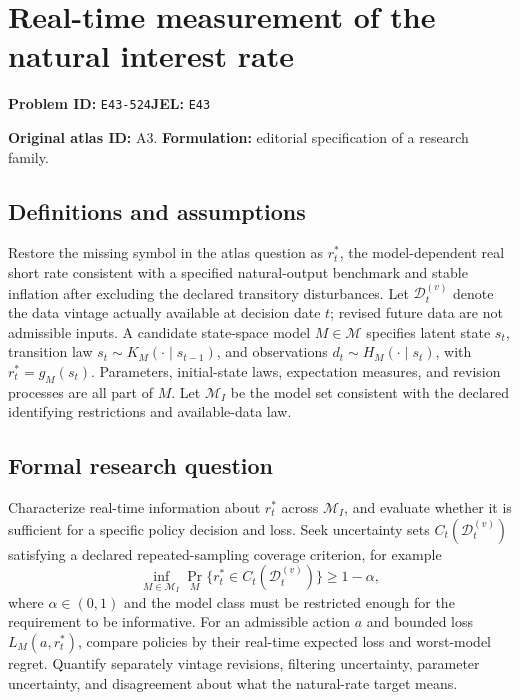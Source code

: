 \documentclass[11pt,a4paper]{article}
\begin{document}
\section*{Real-time measurement of the natural interest rate}
\textbf{Problem ID:} \texttt{E43-524}\quad \textbf{JEL:} \texttt{E43}\par
\label{problem:OP-0013}
\label{atlas:prob:A3}

\noindent\textbf{Original atlas ID:} A3. \textbf{Formulation:} editorial specification of a research family.

\subsection*{Definitions and assumptions}

Restore the missing symbol in the atlas question as $r_t^*$, the model-dependent real short rate consistent with a specified natural-output benchmark and stable inflation after excluding the declared transitory disturbances. Let $\mathcal D_t^{(v)}$ denote the data vintage actually available at decision date $t$; revised future data are not admissible inputs. A candidate state-space model $M\in\mathcal M$ specifies latent state $s_t$, transition law $s_t\sim K_M(\cdot\mid s_{t-1})$, and observations $d_t\sim H_M(\cdot\mid s_t)$, with $r_t^*=g_M(s_t)$. Parameters, initial-state laws, expectation measures, and revision processes are all part of $M$. Let $\mathcal M_I$ be the model set consistent with the declared identifying restrictions and available-data law.

\subsection*{Formal research question}

Characterize real-time information about $r_t^*$ across $\mathcal M_I$, and evaluate whether it is sufficient for a specific policy decision and loss. Seek uncertainty sets $C_t(\mathcal D_t^{(v)})$ satisfying a declared repeated-sampling coverage criterion, for example
\[
\inf_{M\in\mathcal M_I}\Pr_M\{r_t^*\in C_t(\mathcal D_t^{(v)})\}\ge1-\alpha,
\]
where $\alpha\in(0,1)$ and the model class must be restricted enough for the requirement to be informative. For an admissible action $a$ and bounded loss $L_M(a,r_t^*)$, compare policies by their real-time expected loss and worst-model regret. Quantify separately vintage revisions, filtering uncertainty, parameter uncertainty, and disagreement about what the natural-rate target means.
\end{document}
